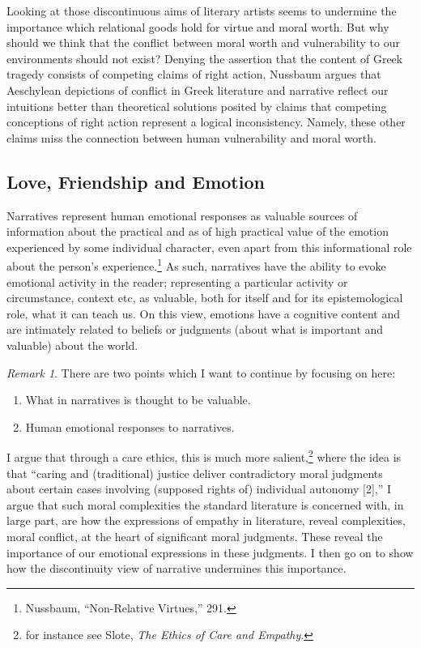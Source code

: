 \documentclass[phdthesis,12pt,final]{wuthesis}
\theoremstyle{definition}
\theoremstyle{definition}
\theoremstyle{definition}
\theoremstyle{definition}
\theoremstyle{remark}
\newtheorem*{remark}{Remark}
\begin{document}
Looking at those discontinuous aims of literary artists seems to undermine the importance which relational goods hold for virtue and moral worth. But why should we think that the conflict between moral worth and vulnerability to our environments should not exist? Denying the assertion that the content of Greek tragedy consists of competing claims of right action, Nussbaum argues that Aeschylean depictions of conflict in Greek literature and narrative reflect our intuitions better than theoretical solutions posited by claims that competing conceptions of right action represent a logical inconsistency. Namely, these other claims miss the connection between human vulnerability and moral worth.

\subsection*{Love, Friendship and Emotion}\label{love-friendship-and-emotion}

Narratives represent human emotional responses as valuable sources of information about the practical and as of high practical value of the emotion experienced by some individual character, even apart from this informational role about the person's experience.\footnote{Nussbaum, {``Non-Relative Virtues,''} 291.} As such, narratives have the ability to evoke emotional activity in the reader; representing a particular activity or circumstance, context etc, as valuable, both for itself and for its epistemological role, what it can teach us. On this view, emotions have a cognitive content and are intimately related to beliefs or judgments (about what is important and valuable) about the world.

\begin{remark}

\noindent There are two points which I want to continue by focusing on here:

\begin{enumerate}
\def\labelenumi{\arabic{enumi}.}
\tightlist
\item
  What in narratives is thought to be valuable.
\item
  Human emotional responses to narratives.
\end{enumerate}

\end{remark}

I argue that through a care ethics, this is much more salient,\footnote{for instance see Slote, \emph{The {Ethics} of {Care} and {Empathy}}.} where the idea is that ``caring and (traditional) justice deliver contradictory moral judgments about certain cases involving (supposed rights of) individual autonomy {[}2{]},'' I argue that such moral complexities the standard literature is concerned with, in large part, are how the expressions of empathy in literature, reveal complexities, moral conflict, at the heart of significant moral judgments. These reveal the importance of our emotional expressions in these judgments. I then go on to show how the discontinuity view of narrative undermines this importance.
\end{document}
